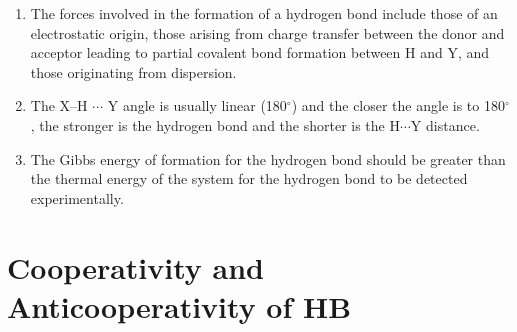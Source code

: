\begin{enumerate}

\item The forces involved in the formation of a hydrogen bond include those of
an electrostatic origin, those arising from charge transfer between the donor
and acceptor leading to partial covalent bond formation between H and Y, and
those originating from dispersion.

\item The X–H $\cdots$ Y angle is usually linear (180$^{\circ}$) and the closer
the angle is to 180$^{\circ}$, the stronger is the hydrogen bond and the
shorter is the $\mathrm{H}\cdots \mathrm{Y}$ distance.

\item The Gibbs energy of formation for the hydrogen bond should be greater
than the thermal energy of the system for the hydrogen bond to be detected
experimentally.

\end{enumerate}
\newpage

\section{Cooperativity and Anticooperativity of HB}

